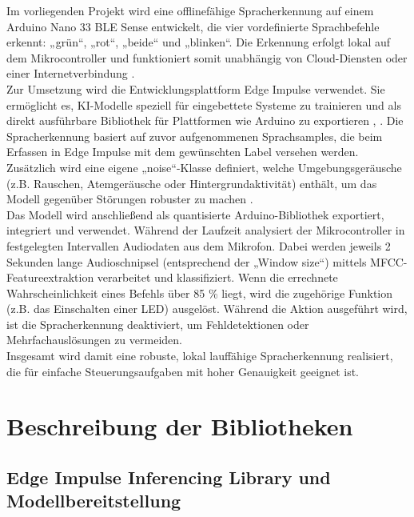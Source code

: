 Im vorliegenden Projekt wird eine offlinefähige Spracherkennung auf einem Arduino Nano 33 BLE Sense entwickelt, die vier vordefinierte Sprachbefehle erkennt: „grün“, „rot“, „beide“ und „blinken“. Die Erkennung erfolgt lokal auf dem Mikrocontroller und funktioniert somit unabhängig von Cloud-Diensten oder einer Internetverbindung \cite{Arduino:2025NanoBLE}.\\
Zur Umsetzung wird die Entwicklungsplattform Edge Impulse verwendet. Sie ermöglicht es, KI-Modelle speziell für eingebettete Systeme zu trainieren und als direkt ausführbare Bibliothek für Plattformen wie Arduino zu exportieren \cite{EdgeImpulseAudioClassification:2025}, \cite{EdgeImpulseVoiceResponse:2025}. Die Spracherkennung basiert auf zuvor aufgenommenen Sprachsamples, die beim Erfassen in Edge Impulse mit dem gewünschten Label versehen werden. Zusätzlich wird eine eigene „noise“-Klasse definiert, welche Umgebungsgeräusche (z.B. Rauschen, Atemgeräusche oder Hintergrundaktivität) enthält, um das Modell gegenüber Störungen robuster zu machen \cite{EdgeImpulseAudioClassification:2025}.\\
Das Modell wird anschließend als quantisierte Arduino-Bibliothek exportiert, integriert und verwendet. Während der Laufzeit analysiert der Mikrocontroller in festgelegten Intervallen Audiodaten aus dem Mikrofon. Dabei werden jeweils 2 Sekunden lange Audioschnipsel (entsprechend der „Window size“) mittels MFCC-Featureextraktion verarbeitet und klassifiziert. Wenn die errechnete Wahrscheinlichkeit eines Befehls über 85 \% liegt, wird die zugehörige Funktion (z.B. das Einschalten einer LED) ausgelöst. Während die Aktion ausgeführt wird, ist die Spracherkennung deaktiviert, um Fehldetektionen oder Mehrfachauslösungen zu vermeiden.\\
Insgesamt wird damit eine robuste, lokal lauffähige Spracherkennung realisiert, die für einfache Steuerungsaufgaben mit hoher Genauigkeit geeignet ist.\\


\section{Beschreibung der Bibliotheken}

\subsection{Edge Impulse Inferencing Library und Modellbereitstellung}

